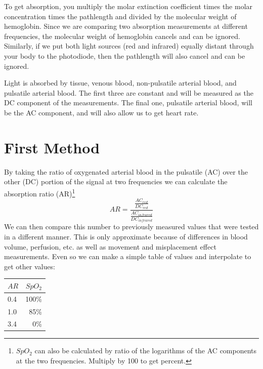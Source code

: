 To get absorption, you multiply the molar extinction coefficient times the molar concentration times the pathlength and divided by the molecular weight of hemoglobin.  Since we are comparing two absorption measurements at different frequencies, the molecular weight of hemoglobin cancels and can be ignored.  Similarly, if we put both light sources (red and infrared) equally distant through your body to the photodiode, then the pathlength will also cancel and can be ignored.  %

Light is absorbed by tissue, venous blood, non-pulsatile arterial blood, and pulsatile arterial blood.  The first three are constant and will be measured as the DC component of the measurements.  The final one, pulsatile arterial blood, will be the AC component, and will also allow us to get heart rate.

\section{First Method}

By taking the ratio of oxygenated arterial blood in the pulsatile (AC) over the other (DC) portion of the signal at two frequencies we can calculate the absorption ratio (AR)\footnote{$SpO_2$ can also be calculated by ratio of the logarithms of the AC components at the two frequencies.  Multiply by 100 to get percent.}
\begin{equation}
AR = \frac{\frac{AC_{red}}{DC_{red}}}{\frac{AC_{infrared}}{DC_{infrared}}}
\end{equation}
We can then compare this number to previously measured values that were tested in a different manner.  This is only approximate because of differences in blood volume, perfusion, etc. as well as movement and misplacement effect measurements.  Even so we can make a simple table of values and interpolate to get other values:

\begin{tabular}{lr}
$AR$ & $SpO_2$ \\\hline
0.4  & 100\% \\
1.0  & 85\% \\
3.4  & 0\% \\
\end{tabular}

